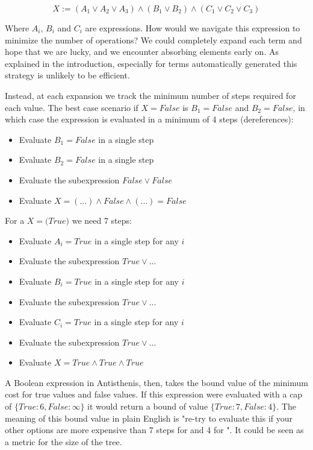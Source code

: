 \[
X := (A_1 \lor A_2 \lor A_3) \land (B_1 \lor B_2) \land (C_1 \lor C_2 \lor C_3)
\]

Where \(A_i\), \(B_i\) and \(C_i\) are expressions. How would we
navigate this expression to minimize the number of operations?  We
could completely expand each term and hope that we are lucky, and we
encounter absorbing elements early on. As explained in the
introduction, especially for terms automatically generated this
strategy is unlikely to be efficient.

Instead, at each expansion we track the minimum number of steps
required for each value. The best case scenario if
\(X = \mathit{False}\) is \(B_1 = \mathit{False}\) and \(B_2 = \mathit{False}\), in
which case the expression is evaluated in a minimum of 4 steps
(dereferences):

\begin{itemize}
\item Evaluate \(B_1 = False\) in a single step
\item Evaluate \(B_2 = False\) in a single step
\item Evaluate the subexpression \(False \lor False\)
\item Evaluate \(X = (...) \land False \land (...) = False\)
\end{itemize}

For a \(X = \mathit(True)\) we need 7 steps:

\begin{itemize}
\item Evaluate \(A_i = True\) in a single step for any \(i\)
\item Evaluate the subexpression \(True \lor ...\)
\item Evaluate \(B_i = True\) in a single step for any \(i\)
\item Evaluate the subexpression \(True \lor ...\)
\item Evaluate \(C_i = True\) in a single step for any \(i\)
\item Evaluate the subexpression \(True \lor ...\)
\item Evaluate \(X = True \land True \land True\)
\end{itemize}

A Boolean expression in Antisthenis, then, takes the bound value of
the minimum cost for true values and false values. If this expression were
evaluated with a cap of \(\{True: 6, False: \infty \}\) it would
return a bound of value \(\{True: 7, False: 4 \}\). The meaning of this
bound value in plain English is "re-try to evaluate this if your other options are more
expensive than 7 steps for  and 4 for ". It
could be seen as a metric for the size of the tree.

